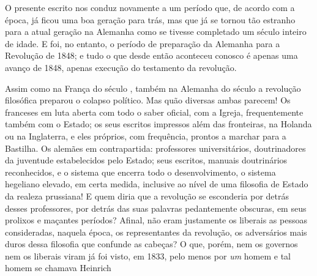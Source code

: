 \noindent{}O presente escrito
nos conduz novamente a um período que, de acordo com a época, já ficou
uma boa geração para trás, mas que já se tornou tão estranho 
para a atual geração na Alemanha como se tivesse
completado um século inteiro de idade. E foi, no entanto, o período de
preparação da Alemanha para a Revolução de 1848; e tudo o que desde
então aconteceu conosco é apenas uma avanço de 1848, apenas execução do
testamento da revolução.

Assim como na França do século , também na Alemanha do século 
a revolução filosófica preparou o colapso político. Mas quão diversas
ambas parecem! Os franceses em luta aberta com todo o saber %
oficial, com a Igreja, frequentemente também com o
Estado; os seus escritos impressos além das fronteiras, na Holanda ou na
Inglaterra, e eles próprios, com frequência, prontos a marchar para
a Bastilha. Os alemães em contrapartida: professores universitários,
doutrinadores da juventude estabelecidos pelo Estado; seus escritos,
manuais doutrinários reconhecidos, e o sistema que encerra todo o
desenvolvimento, o sistema hegeliano elevado, em certa medida, inclusive
ao nível de uma filosofia de Estado da realeza prussiana! E quem diria
que a revolução se esconderia por detrás desses professores, por detrás
das suas palavras pedantemente obscuras, em seus prolixos e maçantes
períodos? Afinal, não eram justamente os liberais as pessoas %
consideradas, naquela época, os representantes da revolução, os
adversários mais duros dessa filosofia que confunde as cabeças? O que,
porém, nem os governos nem os liberais viram já foi visto, em 1833, pelo
menos por \emph{um} homem e tal homem se %
chamava Heinrich

